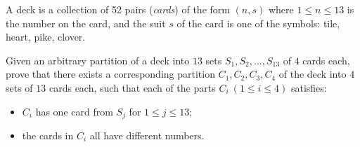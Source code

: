 A deck is a collection of 52 pairs (\emph{cards}) of the form $(n, s)$ where $1 \le n \le 13$ is the number on the card, and the suit $s$ of the card is one of the symbols: tile, heart, pike, clover.

Given an arbitrary partition of a deck into $13$ sets $S_1, S_2, \dots, S_{13}$ of $4$ cards each, prove that there exists a corresponding partition $C_1, C_2, C_3, C_4$ of the deck into $4$ sets of $13$ cards each, such that each of the parts $C_i\ (1 \le i \le 4)$ satisfies:

\begin{itemize}
	\item $C_i$ has one card from $S_j$ for $1 \le j \le 13$;
	\item the cards in $C_i$ all have different numbers.
\end{itemize}
